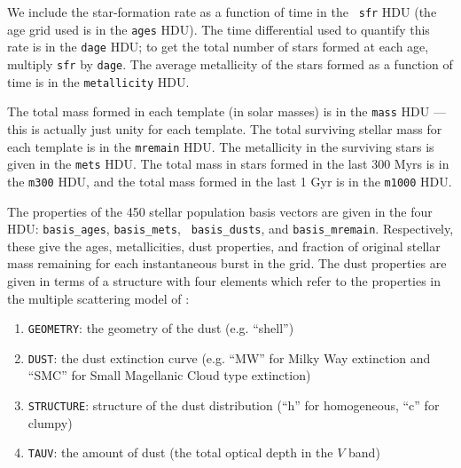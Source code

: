 \documentclass[10pt,preprint]{aastex}
\begin{document}
We include the star-formation rate as a function of time in the {\tt
sfr} HDU (the age grid used is in the {\tt ages} HDU). The time
differential used to quantify this rate is in the {\tt dage} HDU; to
get the total number of stars formed at each age, multiply {\tt sfr}
by {\tt dage}. The average metallicity of the stars formed as a
function of time is in the {\tt metallicity} HDU.

The total mass formed in each template (in solar masses) is in the
{\tt mass} HDU --- this is actually just unity for each template. The
total surviving stellar mass for each template is in the {\tt mremain}
HDU. The metallicity in the surviving stars is given in the {\tt mets}
HDU.  The total mass in stars formed in the last 300 Myrs is in the
{\tt m300} HDU, and the total mass formed in the last 1 Gyr is in the
{\tt m1000} HDU.

The properties of the 450 stellar population basis vectors are given
in the four HDU: {\tt basis\_ages}, {\tt basis\_mets}, {\tt
basis\_dusts}, and {\tt basis\_mremain}. Respectively, these give the
ages, metallicities, dust properties, and fraction of original stellar
mass remaining for each instantaneous burst in the grid. The dust 
properties are given in terms of a structure with four elements which
refer to the properties in the multiple scattering model of \citet{witt00a}:
\begin{enumerate}
\item {\tt GEOMETRY}: the geometry of the dust (e.g. ``shell'') 
\item {\tt DUST}: the dust extinction curve (e.g. ``MW'' for Milky
	Way extinction and ``SMC'' for Small Magellanic Cloud type
	extinction) 
\item {\tt STRUCTURE}: structure of the dust distribution (``h'' for
	homogeneous, ``c'' for clumpy)
\item {\tt TAUV}: the amount of dust (the total optical depth in the
	$V$ band)
\end{enumerate}

\newpage




\end{document}
